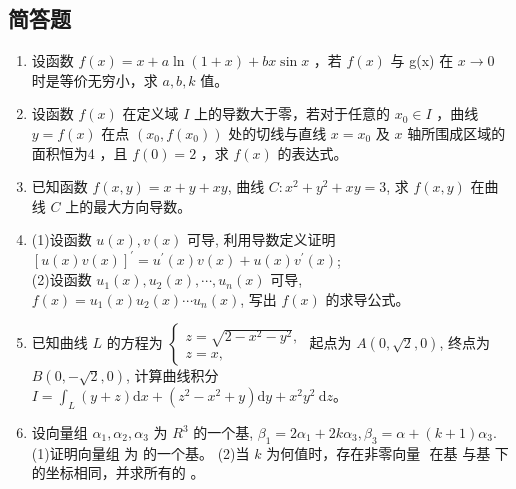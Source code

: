 \subsection{简答题}
\begin{enumerate}
\item 设函数 $f(x)=x+a\ln(1+x)+bx\sin x$ ，若 $f(x)$ 与 g(x) 在 $x \to 0$ 时是等价无穷小，求 $a,b,k$ 值。
\item  设函数 $f(x)$ 在定义域 $I$ 上的导数大于零，若对于任意的 $x_0 \in I$ ，曲线 $y=f(x)$ 在点 $(x_0,f(x_0))$ 处的切线与直线 $x=x_0$ 及 $x$ 轴所围成区域的面积恒为4 ，且 $f(0)=2$ ，求 $f(x)$ 的表达式。
\item  已知函数 $f(x, y)=x+y+x y$, 曲线 $C: x^2+y^2+x y=3$, 求 $f(x, y)$ 在曲线 $C$ 上的最大方向导数。
\item (1)设函数 $u(x), v(x)$ 可导, 利用导数定义证明 $[u(x) v(x)]^{\prime}=u^{\prime}(x) v(x)+u(x) v^{\prime}(x)$;\\
(2)设函数 $u_1(x), u_2(x), \cdots, u_n(x)$ 可导, $f(x)=u_1(x) u_2(x) \cdots u_n(x)$, 写出 $f(x)$ 的求导公式。
\item 已知曲线 $L$ 的方程为 $\left\{\begin{array}{l}z=\sqrt{2-x^2-y^2}, \\ z=x,\end{array}\right.$ 起点为 $A(0, \sqrt{2}, 0)$, 终点为 $B(0,-\sqrt{2}, 0)$, 计算曲线积分 $I=\int_L(y+z) \mathrm{d} x+\left(z^2-x^2+y\right) \mathrm{d} y+x^2 y^2 \mathrm{~d} z$。
\item  设向量组 $\alpha_1,\alpha_2,\alpha_3$ 为 $R^3$ 的一个基, $\beta_1=2\alpha_1+2k\alpha_3,\beta_3=\alpha+(k+1)\alpha_3$.\\
(1)证明向量组   为  的一个基。
(2)当 $k$ 为何值时，存在非零向量 $$ 在基   与基   下的坐标相同，并求所有的  。
\end{enumerate}
